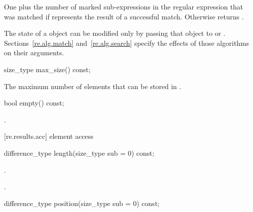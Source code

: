 \begin{itemdescr}
\pnum\returns  One plus the number of marked sub-expressions in the
regular expression that was matched if  represents the
result of a successful match.  Otherwise returns .
\begin{note} The state of a  object can be modified
only by passing that object to  or .
Sections~\ref{re.alg.match} and~\ref{re.alg.search} specify the
effects of those algorithms on their  arguments.
\end{note}
\end{itemdescr}

%
%
\begin{itemdecl}
size_type max_size() const;
\end{itemdecl}

\begin{itemdescr}
\pnum\returns  The maximum number of  elements that can be
stored in .
\end{itemdescr} 

%
%
\begin{itemdecl}
bool empty() const;
\end{itemdecl}

\begin{itemdescr}
\pnum\returns  {}.
\end{itemdescr}

[re.results.acc]{ element access}

%
%
\begin{itemdecl}
difference_type length(size_type sub = 0) const;
\end{itemdecl}

\begin{itemdescr}
\pnum
\requires {}.

\pnum
\returns  {}.
\end{itemdescr}

%
%
\begin{itemdecl}
difference_type position(size_type sub = 0) const;
\end{itemdecl}

